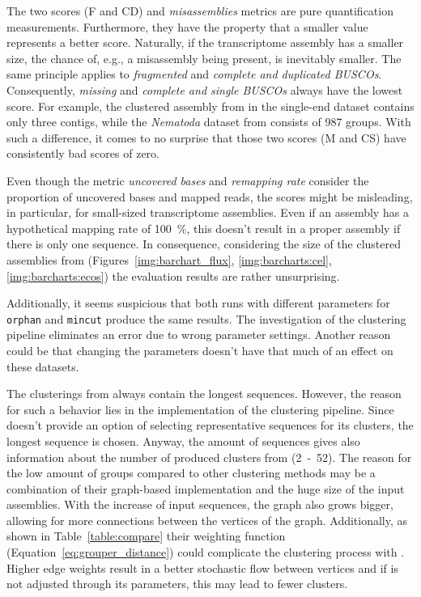\documentclass[12pt,a4paper,english]{article}
\begin{document}
		The two \busco scores (F and CD) and \textit{misassemblies} metrics are pure quantification measurements. Furthermore, they have the property that a smaller value represents a better score.
		Naturally, if the transcriptome assembly has a smaller size, the chance of, e.g., a misassembly being present, is inevitably smaller. The same principle applies to \textit{fragmented} and \textit{complete and duplicated BUSCOs}. 
		Consequently, \textit{missing} and \textit{complete and single BUSCOs} always have the lowest score. For example, the clustered assembly from \grouper in the single-end \celegans dataset contains only three contigs, while the \textit{Nematoda} dataset from \busco consists of 987 \busco groups. With such a difference, it comes to no surprise that those two \busco scores (M and CS) have consistently bad scores of zero.
		
		Even though the metric \textit{uncovered bases} and \textit{remapping rate} consider the proportion of uncovered bases and mapped reads, the scores might be misleading, in particular, for small-sized transcriptome assemblies. Even if an assembly has a hypothetical mapping rate of 100~\%, this doesn't result in a proper assembly if there is only one sequence.    
		In consequence, considering the size of the clustered assemblies from \grouper (Figures~\ref{img:barchart_flux}, \ref{img:barcharts:cel}, \ref{img:barcharts:ecos}) the evaluation results are rather unsurprising.
		
		Additionally, it seems suspicious that both runs with different parameters for \texttt{orphan} and \texttt{mincut} produce the same results. The investigation of the clustering pipeline eliminates an error due to wrong parameter settings. Another reason could be that changing the parameters doesn't have that much of an effect on these datasets.
		
		The clusterings from \grouper always contain the longest sequences. However, the reason for such a behavior lies in the implementation of the clustering pipeline. Since \grouper doesn't provide an option of selecting representative sequences for its clusters, the longest sequence is chosen.
		Anyway, the amount of sequences gives also information about the number of produced clusters from \grouper (2~-~52). The reason for the low amount of groups compared to other clustering methods may be a combination of their graph-based implementation and the huge size of the input assemblies.
		With the increase of input sequences, the graph also grows bigger, allowing for more connections between the vertices of the graph. Additionally, as shown in Table~\ref{table:compare} their weighting function (Equation~\ref{eq:grouper_distance}) could complicate the clustering process with \mcl. Higher edge weights result in a better stochastic flow between vertices and if \mcl is not adjusted through its parameters, this may lead to fewer clusters.
	
\end{document}
